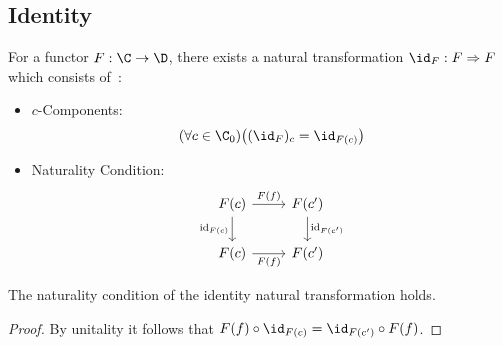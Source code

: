 \subsection{Identity}

\begin{definition}
  For a functor $F:\C\to \D$, there exists a natural transformation $\id_F:
  F\Rightarrow F$ which consists
  of~\parencite[p.~30]{leinster:basic_category_theory}:

  \begin{itemize}
    \item $c$-Components:
      \[(\forall c\in \C_0)
        \big((\id_F)_c = \id_{F(c)}\big)\]
    \item Naturality Condition:
      \[\begin{tikzcd}
        {F(c)} & {F(c')} \\
        {F(c)} & {F(c')}
        \arrow["{F(f)}", from=1-1, to=1-2]
        \arrow["{\mathrm{id}_{F(c)}}"', from=1-1, to=2-1]
        \arrow["{F(f)}"', from=2-1, to=2-2]
        \arrow["{\mathrm{id}_{F(c')}}", from=1-2, to=2-2]
      \end{tikzcd}\]
  \end{itemize}
\end{definition}

\begin{theorem}
  The naturality condition of the identity natural transformation holds.

  \begin{proof}
    By unitality it follows that $F(f) \circ \id_{F(c)} = \id_{F(c')} \circ
    F(f)$.
  \end{proof}
\end{theorem}